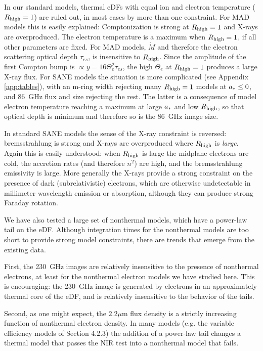 In our standard models, thermal eDFs with equal ion and electron temperature ($R_\mathrm{high} = 1$) are ruled out, in most cases by more than one constraint.  For MAD models this is easily explained: Comptonization is strong at $R_\mathrm{high} = 1$ and X-rays are overproduced.  The electron temperature is a maximum when $R_\mathrm{high} = 1$, if all other parameters are fixed. For MAD models, $\dot{M}$ and therefore the electron scattering optical depth $\tau_{es}$, is insensitive to $R_\mathrm{high}$.  Since the amplitude of the first Compton bump is $\propto y = 16 \Theta_e^2 \tau_{es}$, the high $\Theta_e$ at $R_\mathrm{high} = 1$ produces a large X-ray flux.  For SANE models the situation is more complicated (see Appendix \ref{app:tables}), with an m-ring width rejecting many $R_\mathrm{high} = 1$ models at $a_* \le 0$, and 86~GHz flux and size rejecting the rest.  The latter is a consequence of model electron temperature reaching a maximum at large $a_*$ and low $R_\mathrm{high}$, so that optical depth is minimum and therefore so is the 86~GHz image size.

In standard SANE models the sense of the X-ray constraint is reversed: bremsstrahlung is strong and X-rays are overproduced where $R_\mathrm{high}$ is {\em large}.  Again this is easily understood: when $R_\mathrm{high}$ is large the midplane electrons are cold, the accretion rates (and therefore $n^2$) are high, and the bremsstrahlung emissivity is large.  More generally the X-rays provide a strong constraint on the presence of dark (subrelativistic) electrons, which are otherwise undetectable in millimeter wavelength emission or absorption, although they can produce strong Faraday rotation.  

We have also tested a large set of nonthermal models, which have a power-law tail on the eDF.  Although integration times for the nonthermal models are too short to provide strong model constraints, there are trends that emerge from the existing data.  

First, the 230~GHz images are relatively insensitive to the presence of nonthermal electrons, at least for the nonthermal electron models we have studied here.  This is encouraging: the 230~GHz image is generated by electrons in an approximately thermal core of the eDF, and is relatively insensitive to the behavior of the tails.  

Second, as one might expect, the $2.2\mu$m flux density is a strictly increasing function of nonthermal electron density.  In many models (e.g. the variable efficiency models of Section 4.2.3) the addition of a power-law tail changes a thermal model that passes the NIR test into a nonthermal model that fails.  

